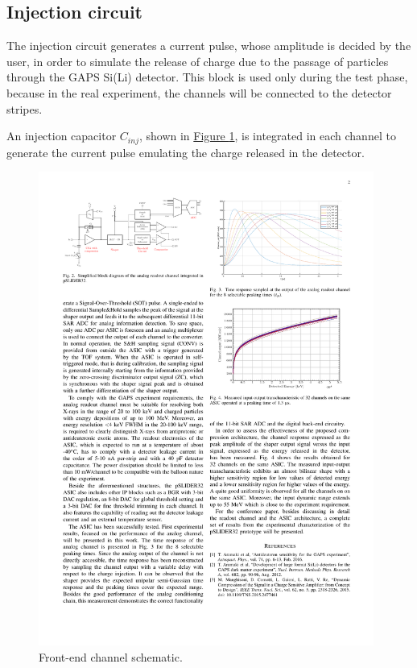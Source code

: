 
\subsection*{Injection circuit}
The injection circuit generates a current pulse, whose amplitude is decided by the user, in order to simulate the release of charge due to the passage of particles through the GAPS Si(Li) detector. This block is used only during the test phase, because in the real experiment, the channels will be connected to the detector stripes. 

\par
An injection capacitor $C_{inj}$, shown in \hyperref[figGAPSchannel]{Figure \ref{figGAPSchannel}}, is integrated in each channel to generate the current pulse emulating the charge released in the detector.

\begin{figure}[h!]
    \centering
    \includegraphics[width=0.98\textwidth]{Images/appendGAPSintro/readoutchannelADC.pdf}
    \caption{Front-end channel schematic.}
    \label{figGAPSchannel}
\end{figure}

